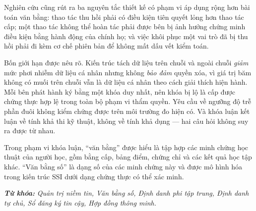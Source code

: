 {Nghiên cứu cũng rút ra ba nguyên tắc thiết kế có phạm vi áp dụng rộng hơn bài toán văn bằng: thao tác thu hồi phải có điều kiện tiên quyết lỏng hơn thao tác cấp; một thao tác không thể hoàn tác phải được bên bị ảnh hưởng chứng minh điều kiện bằng hành động của chính họ; và việc khôi phục một vai trò đã bị thu hồi phải đi kèm cơ chế phiên bản để không mất dấu vết kiểm toán.

Bốn giới hạn được nêu rõ. Kiến trúc tách dữ liệu trên chuỗi và ngoài chuỗi \emph{giảm} mức phơi nhiễm dữ liệu cá nhân nhưng không \emph{bảo đảm} quyền xóa, vì giá trị băm không có muối trên chuỗi vẫn là dữ liệu cá nhân theo cách giải thích hiện hành. Mỗi bên phát hành ký bằng một khóa duy nhất, nên khóa bị lộ là cấp được chứng thực hợp lệ trong toàn bộ phạm vi thẩm quyền. Yêu cầu về ngưỡng độ trễ phần đuôi không kiểm chứng được trên môi trường đo hiện có. Và khóa luận kết luận về tính khả thi kỹ thuật, không về tính khả dụng --- hai câu hỏi không suy ra được từ nhau.

Trong phạm vi khóa luận, {``}văn bằng{''} được hiểu là tập hợp các minh chứng học thuật của người học, gồm bằng cấp, bảng điểm, chứng chỉ và các kết quả học tập khác. {``}Văn bằng số{''} là dạng số của các minh chứng này và được mô hình hóa trong kiến trúc SSI dưới dạng chứng thực có thể xác minh.

\vspace{0.5cm}
\textit{\textbf{Từ khóa:}} \textit{Quản trị niềm tin, Văn bằng số, Định danh phi tập trung, Định danh tự chủ, Sổ đăng ký tin cậy, Hợp đồng thông minh.}
}
